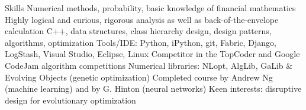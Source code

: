 \begin{rubric}{Skills}
\entry*[]%
Numerical methods, probability, basic knowledge of financial mathematics
\entry*[]%
Highly logical and curious, rigorous analysis as well as back-of-the-envelope calculation
%
%
\entry*[]%
C++, data structures, class hierarchy design, design patterns, algorithms, optimization
\entry*[]%
Tools/IDE: Python, iPython, git, Fabric, Django, LogStash, Visual Studio, Eclipse, Linux
\entry*[]%
Competitor in the TopCoder and Google CodeJam algorithm competitions
%
%
\entry*[]%
Numerical libraries: NLopt, AlgLib, GaLib \& Evolving Objects (genetic optimization)
\entry*[]%
Completed course by Andrew Ng (machine learning) and by G. Hinton (neural networks)
\entry*[]%
Keen interests: disruptive design for evolutionary optimization
%
%
\end{rubric}
